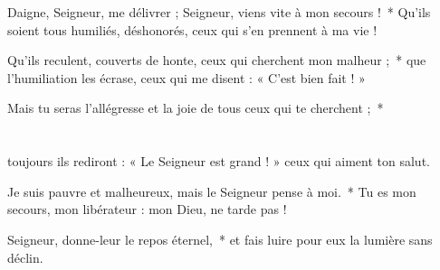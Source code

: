 \item Daigne, Seigneur, me délivrer ; Seigneur, viens vite à mon secours !~* Qu'ils soient tous humiliés, déshonorés, ceux qui s'en prennent à ma vie !

\item Qu'ils reculent, couverts de honte, ceux qui cherchent mon malheur ;~* que l'humiliation les écrase, ceux qui me disent : « C'est bien fait ! »

\item Mais tu seras l'allégresse et la joie de tous ceux qui te cherchent ;~* \\~\\~\\toujours ils rediront : « Le Seigneur est grand ! » ceux qui aiment ton salut.

\item Je suis pauvre et malheureux, mais le Seigneur pense à moi.~* Tu es mon secours, mon libérateur : mon Dieu, ne tarde pas !

\item Seigneur, donne-leur le repos éternel,~* et fais luire pour eux la lumière sans déclin.